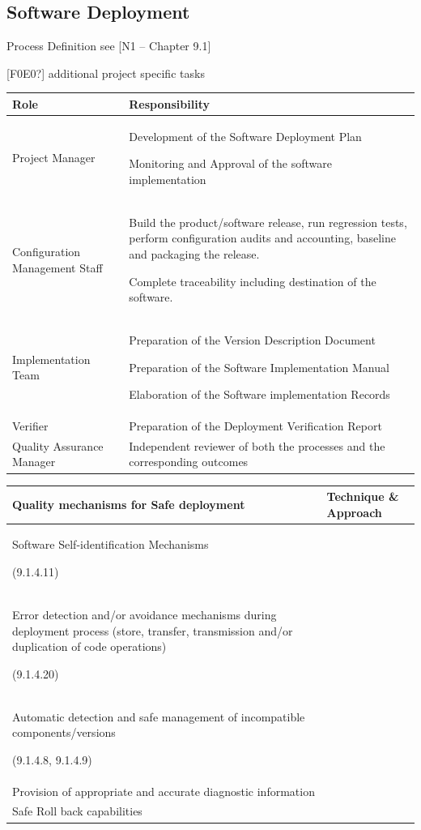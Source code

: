 \documentclass{template/openetcs_article}
\begin{document}
\subsection{Software Deployment}
Process Definition see [N1 -- Chapter 9.1]

[F0E0?] additional project specific tasks

\begin{flushleft}
\tablefirsthead{}
\tablehead{}
\tabletail{}
\tablelasttail{}
\begin{supertabular}{|m{5cm}|m{9cm}|}
\hline
{}
Role &
Responsibility\\\hline
Project Manager &
Development of the Software Deployment Plan

Monitoring and Approval of the software implementation\\\hline
Configuration Management Staff &
Build the product/software release, run regression tests, perform configuration audits and accounting, baseline and packaging the release.

Complete traceability including destination of the software.\\\hline
Implementation Team &
Preparation of the Version Description Document

Preparation of the Software Implementation Manual

Elaboration of the Software implementation Records\\\hline
Verifier &
Preparation of the Deployment Verification Report\\\hline
Quality Assurance Manager &
Independent reviewer of both the processes and the corresponding outcomes\\\hline
\end{supertabular}
\end{flushleft}



\begin{flushleft}
\tablefirsthead{}
\tablehead{}
\tabletail{}
\tablelasttail{}
\begin{supertabular}{|m{7cm}|m{7cm}|}
\hline
{}
Quality mechanisms for Safe deployment &
Technique \& Approach\\\hline
Software Self-identification Mechanisms

(9.1.4.11) &
~
\\\hline
Error detection and/or avoidance mechanisms during deployment process (store, transfer, transmission and/or duplication of code operations)

(9.1.4.20) &
~
\\\hline
Automatic detection and safe management of incompatible components/versions

(9.1.4.8, 9.1.4.9) &
~
\\\hline
Provision of appropriate and accurate diagnostic information &
~
\\\hline
Safe Roll back capabilities  &
~
\\\hline
\end{supertabular}
\end{flushleft}
\end{document}
